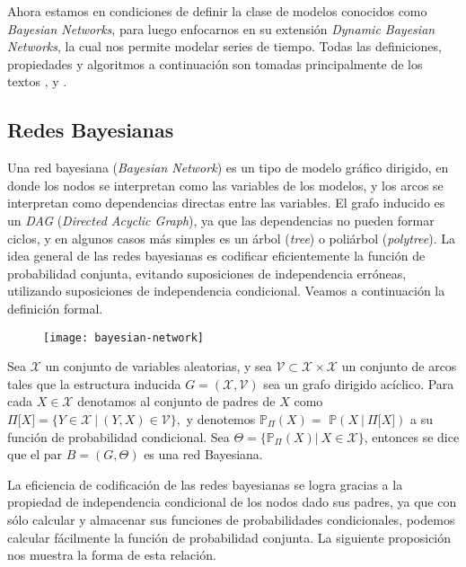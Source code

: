 Ahora estamos en condiciones de definir la clase de modelos conocidos como \emph{Bayesian Networks}, para luego enfocarnos en su extensión \emph{Dynamic Bayesian Networks}, la cual nos permite modelar series de tiempo. Todas las definiciones, propiedades y algoritmos a continuación son
tomadas principalmente de los textos \cite{DBN-StateOfArt}, \cite
{DBN-LearningDBN} y \cite{DBN-Murphy}.

\subsection{Redes Bayesianas}

Una red bayesiana (\emph{Bayesian Network}) es un tipo de modelo gráfico dirigido, en donde los nodos se interpretan como las variables de los modelos, y los arcos se interpretan como dependencias directas entre las variables. El grafo inducido es un \emph{DAG} (\emph{Directed Acyclic Graph}), ya que las dependencias no pueden formar ciclos, y en algunos casos más simples es un árbol (\emph{tree}) o poliárbol (\emph{polytree}). La idea general de las redes bayesianas es codificar eficientemente la función de probabilidad conjunta, evitando suposiciones de independencia erróneas, utilizando suposiciones de independencia condicional. Veamos a
continuación la definición formal.

\begin{figure}
	\centering
	\texttt{[image: bayesian-network]}
\end{figure}

\begin{definition}
Sea $\mathcal{X}$ un conjunto de variables aleatorias, y sea $\mathcal{V\subset X\times X}$ un conjunto de arcos tales que la estructura inducida $G=(\mathcal{X},\mathcal{V})$ sea un grafo dirigido acíclico. Para cada $X\in \mathcal{X}$ denotamos al conjunto de padres de $X$ como $\Pi \lbrack X]=\{Y\in\mathcal{X}\ |\ (Y,X)\in \mathcal{V}\},$ y denotemos $\mathbb{P}_{\Pi }(X)=$ $\mathbb{P}(X\ |\ \Pi \lbrack X])$ a su función de  probabilidad condicional. Sea $\Theta=\{\mathbb{P}_{\Pi }(X)|\ X\in \mathcal{X}\}$, entonces se dice que el par $B=(G,\Theta )$ es una red Bayesiana.
\end{definition}

La eficiencia de codificación de las redes bayesianas se logra gracias a la propiedad de independencia condicional de los nodos dado sus padres, ya que con sólo calcular y almacenar sus funciones de probabilidades condicionales, podemos calcular fácilmente la función de probabilidad conjunta. La siguiente proposición nos muestra la forma de esta relación.

